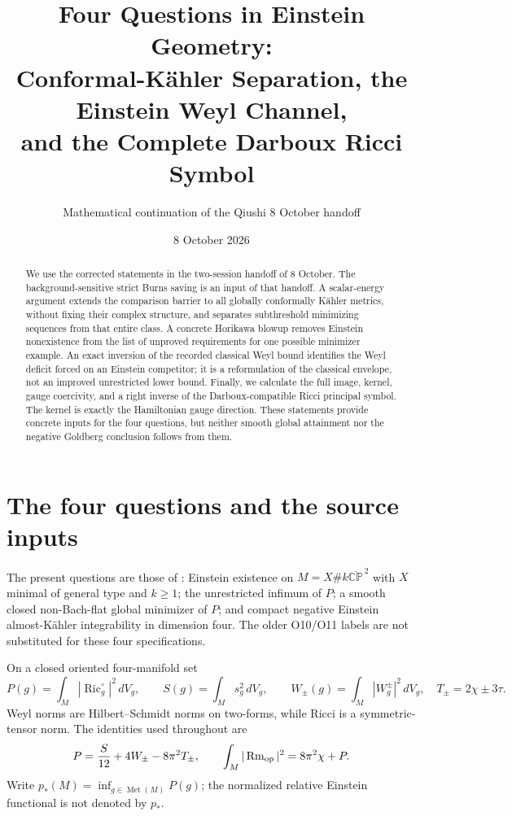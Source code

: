 \documentclass[11pt,a4paper]{article}
\title{Four Questions in Einstein Geometry:\\[3pt]
Conformal-K\"ahler Separation, the Einstein Weyl Channel,\\
and the Complete Darboux Ricci Symbol}
\author{Mathematical continuation of the Qiushi 8 October handoff}
\date{8 October 2026}
\numberwithin{equation}{section}
\theoremstyle{definition}\newtheorem{hypothesis}[theorem]{Input}
\theoremstyle{remark}\newtheorem{remark}[theorem]{Remark}
\newcommand{\Ric}{\operatorname{Ric}}
\newcommand{\Rm}{\operatorname{Rm}}
\newcommand{\Met}{\operatorname{Met}}
\newcommand{\CP}{\mathbb{CP}}
\begin{document}
\maketitle
\begin{abstract}
We use the corrected statements in the two-session handoff of 8 October.
The background-sensitive strict Burns saving is an input of that handoff.
A scalar-energy argument extends the comparison barrier to all globally
conformally K\"ahler metrics, without fixing their complex structure, and
separates subthreshold minimizing sequences from that entire class.
A concrete Horikawa blowup removes Einstein nonexistence from the list of
unproved requirements for one possible minimizer example.
An exact inversion of the recorded classical Weyl bound identifies the
Weyl deficit forced on an Einstein competitor; it is a reformulation of the
classical envelope, not an improved unrestricted lower bound.
Finally, we calculate the full image, kernel, gauge coercivity, and a right
inverse of the Darboux-compatible Ricci principal symbol.  The kernel is
exactly the Hamiltonian gauge direction.  These statements provide concrete
inputs for the four questions, but neither smooth global attainment nor the
negative Goldberg conclusion follows from them.
\end{abstract}

\section{The four questions and the source inputs}

The present questions are those of \cite[Section 1]{Synthesis}:
Einstein existence on $M=X\#k\overline{\CP}^{\,2}$ with $X$ minimal of
general type and $k\ge1$; the unrestricted infimum of $P$; a smooth closed
non-Bach-flat global minimizer of $P$; and compact negative Einstein
almost-K\"ahler integrability in dimension four.  The older O10/O11 labels
are not substituted for these four specifications.

On a closed oriented four-manifold set
\begin{equation}
 P(g)=\int_M|\Ric_g^\circ|^2\,dV_g,\qquad
 S(g)=\int_M s_g^2\,dV_g,\qquad
 W_\pm(g)=\int_M|W_g^\pm|^2\,dV_g,
 \quad T_\pm=2\chi\pm3\tau.
\end{equation}
Weyl norms are Hilbert--Schmidt norms on two-forms, while Ricci is a
symmetric-tensor norm.  The identities used throughout are
\begin{equation}\label{eq:CW}
 P=\frac S{12}+4W_\pm-8\pi^2T_\pm,
 \qquad \int_M|\Rm_{\rm op}|^2=8\pi^2\chi+P.
\end{equation}
Write $p_*(M)=\inf_{g\in\Met(M)}P(g)$; the normalized relative Einstein
functional is not denoted by $p_*$.
\end{document}
